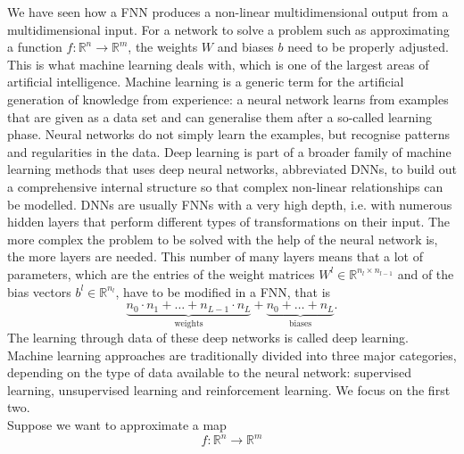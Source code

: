 We have seen how a FNN produces a non-linear multidimensional output from a multidimensional input. For a network to solve a problem such as approximating a function $f \colon \mathbb{R}^n \to \mathbb{R}^m$, the weights $W$ and biases $b$ need to be properly adjusted. This is what machine learning deals with, which is one of the largest areas of artificial intelligence. Machine learning is a generic term for the artificial generation of knowledge from experience: a neural network learns from examples that are given as a data set and can generalise them after a so-called learning phase. Neural networks do not simply learn the examples, but recognise patterns and regularities in the data. Deep learning is part of a broader family of machine learning methods that uses deep neural networks, abbreviated DNNs, to build out a comprehensive internal structure so that complex non-linear relationships can be modelled. DNNs are usually FNNs with a very high depth, i.e. with numerous hidden layers that perform different types of transformations on their input. The more complex the problem to be solved with the help of the neural network is, the more layers are needed. This number of many layers means that a lot of parameters, which are the entries of the weight matrices $W^l \in \mathbb{R}^{n_l \times n_{l-1}}$ and of the bias vectors $b^l \in \mathbb{R}^{n_l}$, have to be modified in a FNN, that is
\begin{equation*}
    \underbrace{n_0 \cdot n_1 + \ldots + n_{L-1} \cdot n_L}_{\text{weights}} + \underbrace{n_0 + \ldots + n_L}_{\text{biases}}.
\end{equation*}
The learning through data of these deep networks is called deep learning. Machine learning approaches are traditionally divided into three major categories, depending on the type of data available to the neural network: supervised learning, unsupervised learning and reinforcement learning. We focus on the first two. \\
Suppose we want to approximate a map
\begin{equation*}
    f \colon \mathbb{R}^n \to \mathbb{R}^m
\end{equation*}
